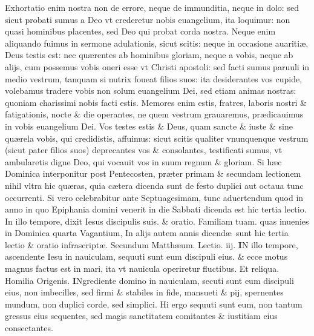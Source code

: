 \documentclass[a5paper,10pt]{book}
\def\rightmarginnote{%
	\lrmarginnote{\hskip\columnwidth \hskip -1em}}
\def\ae{æ}
\begin{document}
\begin{multicols*}{2}
Exhortatio enim nostra non de errore, neque de immunditia, neque in dolo: sed sicut probati sumus a Deo vt crederetur nobis euangelium, ita loquimur: non quasi hominibus placentes, sed Deo qui probat corda nostra.
Neque enim aliquando fuimus in sermone adulationis, sicut scitis: neque in occasione auariti\ae , Deus testis est: nec qu\ae rentes ab hominibus gloriam, neque a vobis, neque ab alijs, cum possemus vobis oneri esse vt Christi apostoli: sed facti sumus paruuli in medio vestrum, tanquam si nutrix foueat filios suos: ita desiderantes vos cupide, volebamus tradere vobis non solum euangelium Dei, sed etiam animas nostras: quoniam charissimi nobis facti estis.
Memores enim estis, fratres, laboris
nostri \& fatigationis, nocte \& die operantes, ne quem vestrum grauaremus, pr\ae dicauimus in vobis euangelium Dei.
Vos testes estis \& Deus, quam sancte \& iuste \& sine qu\ae rela vobis, qui credidistis, affuimus: sicut scitis qualiter vnunquenque vestrum (sicut pater filios suos) deprecantes vos \& consolantes, testificati sumus, vt ambularetis digne Deo, qui vocauit vos in suum regnum \& gloriam.
\newline {} \color{red} Si h\ae c Dominica interponitur post Pentecosten, pr\ae ter primam \& secundam lectionem nihil vltra hic qu\ae ras, quia c\ae tera dicenda sunt de festo duplici aut octaua tunc occurrenti. \color{black}
\newline {} \color{red} Si vero celebrabitur ante Septuagesimam, tunc aduertendum quod in anno in quo Epiphania domini venerit in die Sabbati dicenda est hic tertia lectio. \color{black} In illo tempore, dixit Iesus discipulis suis. \color{red} \& oratio. \color{black} Familiam tuam. \color{red} quas inuenies in Dominica quarta Vagantium, In alijs autem annis dicend\ae \ sunt hic tertia lectio \& oratio infrascript\ae . \color{black}
\newline \color{red} Secundum Matth\ae um. \hfill Lectio. iij. \color{black}
\vspace{-.25em}
\lettrine[lines=2]{\bfseries \color{red} I}{}N\rightmarginnote{ca. 8.} illo tempore, ascendente Iesu in nauiculam, sequuti sunt eum discipuli eius. \& ecce motus magnus factus est in mari, ita vt nauicula operiretur fluctibus.
\color{red} Et reliqua. Homilia Origenis.\color{black}
\vspace{-.25em}
\lettrine[lines=2]{\bfseries \color{red} I}{}Ngrediente domino in nauiculam, secuti sunt eum discipuli eius, non imbecilles, sed firmi \& stabiles in fide, mansueti \& pij, spernentes mundum, non duplici corde, sed simplici. Hi ergo sequuti sunt eum, non tantum gressus eius sequentes, sed magis sanctitatem comitantes \& iustitiam eius consectantes.

\end{multicols*}
\end{document}
